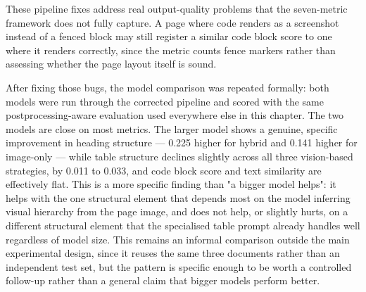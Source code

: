 These pipeline fixes address real output-quality problems that the seven-metric framework does not fully capture. A page where code renders as a screenshot instead of a fenced block may still register a similar code block score to one where it renders correctly, since the metric counts fence markers rather than assessing whether the page layout itself is sound.

After fixing those bugs, the model comparison was repeated formally: both models were run through the corrected pipeline and scored with the same postprocessing-aware evaluation used everywhere else in this chapter. The two models are close on most metrics. The larger model shows a genuine, specific improvement in heading structure --- 0.225 higher for hybrid and 0.141 higher for image-only --- while table structure declines slightly across all three vision-based strategies, by 0.011 to 0.033, and code block score and text similarity are effectively flat. This is a more specific finding than "a bigger model helps": it helps with the one structural element that depends most on the model inferring visual hierarchy from the page image, and does not help, or slightly hurts, on a different structural element that the specialised table prompt already handles well regardless of model size. This remains an informal comparison outside the main experimental design, since it reuses the same three documents rather than an independent test set, but the pattern is specific enough to be worth a controlled follow-up rather than a general claim that bigger models perform better.

